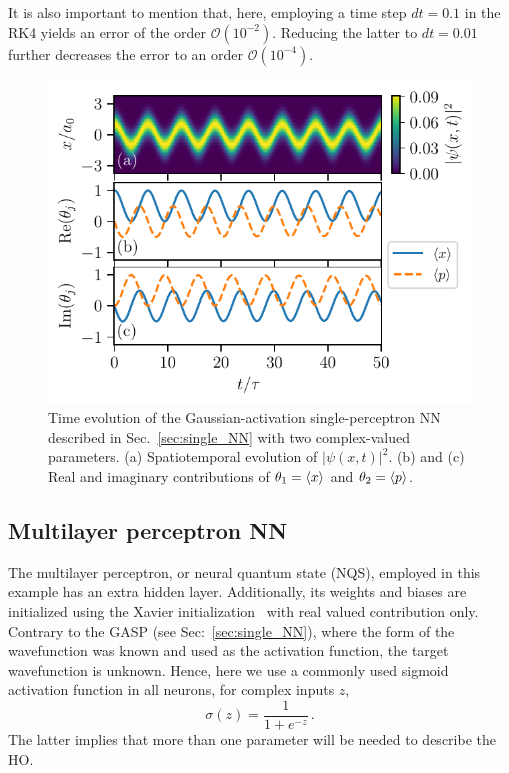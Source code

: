 \documentclass[aps,pre,superscriptaddress,amsmath,amssymb,amsfonts,twocolumn,showpacs,notitlepage]{revtex4-1}
\begin{document}
	It is also important to mention that, here, employing a time step $dt=0.1$ in the RK4 yields an error of the order $\mathcal{O}(10^{-2})$.
	Reducing the latter to $dt=0.01$ further decreases the error to an order $\mathcal{O}(10^{-4})$.
	\begin{figure} 
		\centering
		\includegraphics[width=\columnwidth]{double.pdf}
		\caption{
			Time evolution of the Gaussian-activation single-perceptron NN described in Sec.~\ref{sec:single_NN} with two complex-valued parameters.
			(a) Spatiotemporal evolution of $|\psi(x,t)|^2$. 
			(b) and (c) Real and imaginary contributions of $\theta_1 = \ev{x}$ and $\theta_2 = \ev{p}$.
		}
		\label{fig:double}
	\end{figure}
	
\subsection{Multilayer perceptron NN} \label{sec:MLP_NN}
	
	The multilayer perceptron, or neural quantum state (NQS), employed in this example has an extra hidden layer.
	Additionally, its weights and biases are initialized using the Xavier initialization~\cite{Glorot2010} with real valued contribution only.
	Contrary to the GASP (see Sec:~\ref{sec:single_NN}), where the form of the wavefunction was known and used as the activation function, the target wavefunction is unknown.
	Hence, here we use a commonly used sigmoid activation function in all neurons, for complex inputs $z$,
	\begin{equation}
		\sigma(z) = \frac{1}{1+e^{-z}} \,.
	\end{equation}
	The latter implies that more than one parameter will be needed to describe the HO.
	
\end{document}
